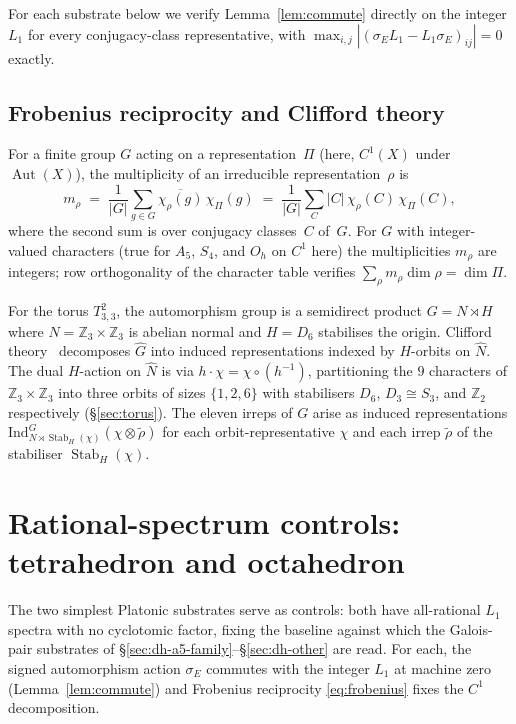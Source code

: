 \documentclass[12pt,a4paper]{article}
\theoremstyle{definition}
\theoremstyle{remark}
\newcommand{\bZ}{\mathbb{Z}}
\DeclareMathOperator{\Aut}{Aut}
\DeclareMathOperator{\Stab}{Stab}
\begin{document}
For each substrate below we verify Lemma~\ref{lem:commute} directly on
the integer $L_1$ for every conjugacy-class representative, with
$\max_{i,j} |(\sigma_E L_1 - L_1 \sigma_E)_{ij}| = 0$ exactly.

\subsection{Frobenius reciprocity and Clifford theory}\label{sec:dh-bg-frobenius}

For a finite group $G$ acting on a representation~$\Pi$ (here, $C^1(X)$
under $\Aut(X)$), the multiplicity of an irreducible representation~$\rho$
is
\begin{equation}\label{eq:frobenius}
  m_\rho \;=\; \frac{1}{|G|} \sum_{g \in G} \overline{\chi_\rho(g)}\,
  \chi_\Pi(g) \;=\; \frac{1}{|G|} \sum_C |C|\, \chi_\rho(C)\, \chi_\Pi(C),
\end{equation}
where the second sum is over conjugacy classes~$C$ of~$G$. For $G$ with
integer-valued characters (true for $A_5$, $S_4$, and $O_h$ on $C^1$ here)
the multiplicities $m_\rho$ are integers; row orthogonality of the
character table verifies $\sum_\rho m_\rho \dim\rho = \dim \Pi$.

For the torus $T^2_{3,3}$, the automorphism group is a semidirect product
$G = N \rtimes H$ where $N = \bZ_3 \times \bZ_3$ is abelian normal and
$H = D_6$ stabilises the origin. Clifford theory~\cite{Serre77} decomposes
$\widehat G$ into induced representations indexed by $H$-orbits on
$\widehat N$. The dual $H$-action on $\widehat N$ is via $h \cdot \chi
= \chi \circ (h^{-1})$, partitioning the $9$ characters of
$\bZ_3 \times \bZ_3$ into three orbits of sizes $\{1, 2, 6\}$ with
stabilisers $D_6$, $D_3 \cong S_3$, and $\bZ_2$ respectively
(\S\ref{sec:torus}). The eleven irreps of $G$ arise as induced
representations $\mathrm{Ind}_{N \rtimes \Stab_H(\chi)}^G(\chi \otimes
\tilde\rho)$ for each orbit-representative $\chi$ and each irrep
$\tilde\rho$ of the stabiliser $\Stab_H(\chi)$.


\section{Rational-spectrum controls: tetrahedron and
octahedron}\label{sec:dh-controls}

The two simplest Platonic substrates serve as controls: both have
all-rational $L_1$ spectra with no cyclotomic factor, fixing the baseline
against which the Galois-pair substrates of
\S\ref{sec:dh-a5-family}--\S\ref{sec:dh-other} are read. For each, the
signed automorphism action $\sigma_E$ commutes with the integer $L_1$ at
machine zero (Lemma~\ref{lem:commute}) and Frobenius reciprocity
\eqref{eq:frobenius} fixes the $C^1$ decomposition.
\end{document}
